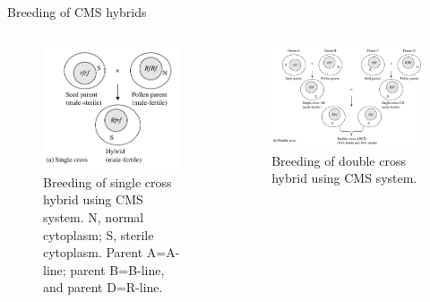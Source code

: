 \documentclass[11pt,ignorenonframetext,aspectratio=169]{beamer}
\newcommand{\bcolumns}{\begin{columns}[T, onlytextwidth]}
\newcommand{\ecolumns}{\end{columns}}
\begin{document}
\begin{frame}{Breeding of CMS hybrids}
\protect\hypertarget{breeding-of-cms-hybrids}{}
\bcolumns
{}
\begin{figure}

{\centering \includegraphics[width=0.9\linewidth]{./images/cms_hybrids_single} 

}

\caption{Breeding of single cross hybrid using CMS system. N, normal cytoplasm; S, sterile cytoplasm. Parent A=A-line; parent B=B-line, and parent D=R-line.}\label{fig:cms-hybrids-single}
\end{figure}

\begin{figure}

{\centering \includegraphics[width=0.98\linewidth]{./images/cms_hybrids_double} 

}

\caption{Breeding of double cross hybrid using CMS system.}\label{fig:cms-hybrids-double}
\end{figure}

\ecolumns
\end{frame}
\end{document}
